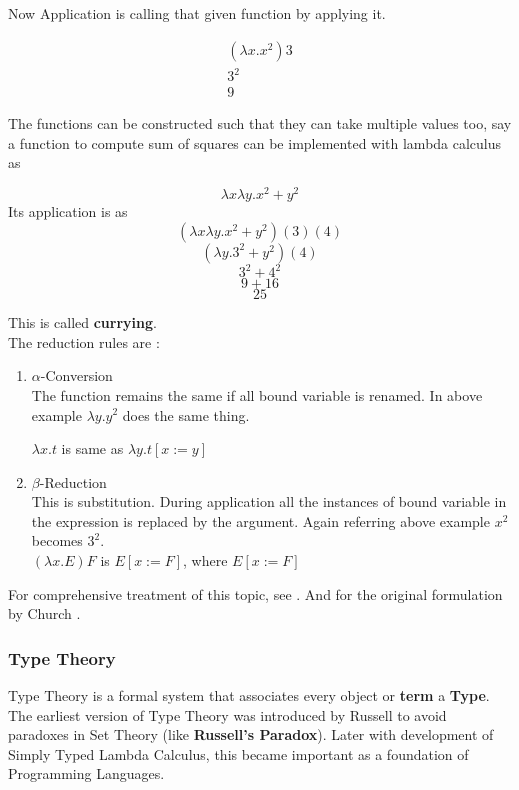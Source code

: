 \documentclass[12pt]{article}
\begin{document}
Now Application is calling that given function by applying it.

\begin{example}
\begin{align*}
 (\lambda x.x^2) 3\\
 3^2 \\
 9
\end{align*}
\end{example}
The functions can be constructed such that they can take multiple values too, say a function to compute sum of squares can be implemented with lambda calculus as

\begin{example}
    $$\lambda x \lambda y. x^2 +y^2$$
Its application is as 
$$(\lambda x \lambda y. x^2 +y^2) (3) (4)$$
$$(\lambda y. 3^2 + y^2)(4)$$
$$3^2+4^2$$
$$9+16$$
$$25$$
\end{example}

This is called \textbf{currying}.\\
The reduction rules are :

\begin{enumerate}
    \item $\alpha$-Conversion \\
    \indent The function remains the same if all bound variable is renamed.
    In above example $\lambda y. y^2$ does the same thing.

$\lambda x.t$ is same as $ \lambda y.t[x:=y]$
    \item $\beta$-Reduction\\
     This is substitution. During application all the instances of bound variable in the expression is replaced by the argument. Again referring above example $x^2$ becomes $3^2$.\\
     $(\lambda x.E) F$ is $E[x := F]$, where $E[x := F]$
\end{enumerate}
For comprehensive treatment of this topic, see \cite{Rojas2015}. And for the original formulation by Church \cite{church1936unsolvable}.





\subsubsection{Type Theory}
Type Theory is a formal system that associates every object or \textbf{term} a \textbf{Type}. The earliest version of Type Theory was introduced by Russell to avoid paradoxes in Set Theory (like \textbf{Russell's Paradox}). Later with development of Simply Typed Lambda Calculus, this became important as a foundation of Programming Languages.\\
\end{document}
